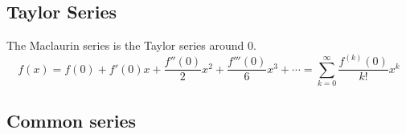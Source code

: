 \subsection{Taylor Series}

The Maclaurin series is the Taylor series around \(0\).
\begin{equation}
f(x) = f(0) + f'(0) x + \frac{f''(0)} 2 x^2 + \frac{f'''(0)}6 x^3 +\dotsb
  = \sum_{k=0}^\infty \frac{f^{(k)}(0)}{k!}x^k
\end{equation}

\subsection{Common series}
